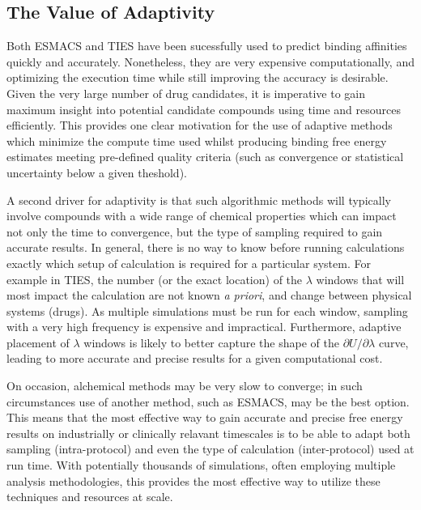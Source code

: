 
\subsection{The Value of Adaptivity}

Both ESMACS and TIES have been sucessfully used to predict binding affinities
quickly and accurately. Nonetheless, they are very expensive computationally,
and optimizing the execution time while still improving the accuracy is
desirable. Given the very large number of drug candidates, it is imperative to
gain maximum insight into potential candidate compounds using time and
resources efficiently. This provides one clear motivation for the use of
adaptive methods which minimize the compute time used whilst producing binding
free energy estimates meeting pre-defined quality criteria (such as
convergence or statistical uncertainty below a given theshold).
  

A second driver for adaptivity is that such algorithmic methods  will
typically involve compounds with a wide range of chemical properties which can
impact not only the time to convergence, but the type of sampling required to
gain accurate results. In general, there is no way to know before running
calculations exactly which setup of calculation is required for a particular
system. For example in TIES, the number (or the exact location) of the
$\lambda$ windows that will most impact the calculation are not known
\textit{a priori}, and change between physical systems (drugs). As multiple
simulations must be run for each window, sampling with a very high frequency
is expensive and impractical. Furthermore, adaptive placement of $\lambda$
windows is likely to better capture the shape of the $\partial U/\partial\lambda$ curve,
leading to more accurate and precise results for a given computational cost.

On occasion, alchemical methods may be very slow to converge; in such
circumstances use of another method, such as ESMACS, may be the best option.
This means that the most effective way to gain accurate and precise free
energy results on industrially or clinically relavant timescales is to be able
to adapt both sampling (intra-protocol) and even the type of calculation (inter-protocol) used at run time. 
With potentially thousands of simulations, often
employing multiple analysis methodologies, this provides the most effective way to utilize these techniques and resources at scale.

